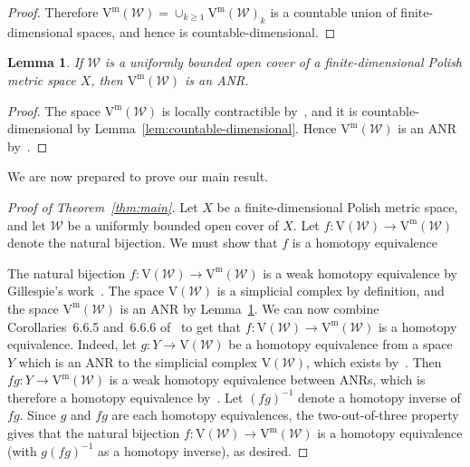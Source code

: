 \documentclass[11pt, reqno, english]{amsart}
\theoremstyle{plain}
\newtheorem{lemma}{Lemma}[section]
\theoremstyle{definition}
\theoremstyle{myremark}
\newcommand{\cF}{\mathcal{F}}
\newcommand{\cW}{\mathcal{W}}
\newcommand{\note}[1]{\textcolor{blue}{({#1})}}
\newcommand{\vr}[2]{\mathrm{VR}(#1;#2)}
\newcommand{\viet}[1]{\mathrm{V}(#1)}
\newcommand{\vietm}[1]{\mathrm{V}^\mathrm{m}(#1)}
\begin{document}
\begin{proof}

Therefore $\vietm{\cW}=\cup_{k\ge 1}\vietm{\cW}_k$ is a countable union of finite-dimensional spaces, and hence is countable-dimensional.
\end{proof}

\begin{lemma}
\label{lem:anr}
If $\cW$ is a uniformly bounded open cover of a finite-dimensional Polish metric space $X$, then $\vietm{\cW}$ is an ANR.
\end{lemma}

\begin{proof}
The space $\vietm{\cW}$ is locally contractible by~\cite[Theorem~2]{HA-FF-ZV}, and it is countable-dimensional by Lemma~\ref{lem:countable-dimensional}.
Hence $\vietm{\cW}$ is an ANR by~\cite[Theorem~6.10.1]{sakai2013geometric}.
\end{proof}

We are now prepared to prove our main result.

\begin{proof}[Proof of Theorem~\ref{thm:main}]
Let $X$ be a finite-dimensional Polish metric space, and let $\cW$ be a uniformly bounded open cover of $X$.
Let $f\colon \viet{\cW}\to\vietm{\cW}$ denote the natural bijection.
We must show that $f$ is a homotopy equivalence

The natural bijection $f\colon\viet{\cW}\to\vietm{\cW}$ is a weak homotopy equivalence by Gillespie's work~\cite{gillespie2024vietoris}.
The space $\viet{\cW}$ is a simplicial complex by definition, and the space $\vietm{\cW}$ is an ANR by Lemma~\ref{lem:anr}.
We can now combine Corollaries~6.6.5 and~6.6.6 of~\cite{sakai2013geometric} to get that $f\colon\viet{\cW}\to\vietm{\cW}$ is a homotopy equivalence.
Indeed, let $g\colon Y\to \viet{\cW}$ be a homotopy equivalence from a space $Y$ which is an ANR to the simplicial complex $\viet{\cW}$, which exists by~\cite[Corollary~6.6.5]{sakai2013geometric}.
Then $fg\colon Y\to \vietm{\cW}$ is a weak homotopy equivalence between ANRs, which is therefore a homotopy equivalence by~\cite[Corollary~6.6.6]{sakai2013geometric}.
Let $(fg)^{-1}$ denote a homotopy inverse of $fg$.
Since $g$ and $fg$ are each homotopy equivalences, the two-out-of-three property gives that the natural bijection $f\colon\viet{\cW}\to\vietm{\cW}$ is a homotopy equivalence (with $g(fg)^{-1}$ as a homotopy inverse), as desired.
\end{proof}
\end{document}
